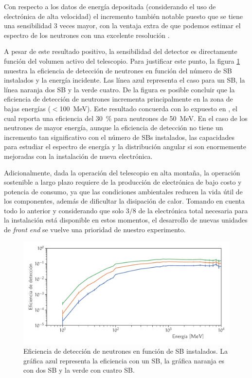 Con respecto a los datos de energía depositada (considerando el uso de electrónica de alta velocidad) el incremento también notable puesto que se tiene una sensibilidad \num{3} veces mayor, con la ventaja extra de que podemos estimar el espectro de los neutrones con una excelente resolución \cite{ysasai17}.

A pesar de este resultado positivo, la sensibilidad del detector es directamente función del volumen activo del telescopio. Para justificar este punto, la figura \ref{fig:eficiencia-electronica} muestra la eficiencia de detección de neutrones en función del número de SB instalados y la energía incidente. Las línea azul representa el caso para un SB, la línea naranja dos SB y la verde cuatro. De la figura es posible concluir que la eficiencia de detección de neutrones incrementa principalmente en la zona de bajas energías ($<$\SI{100}{\mega\electronvolt}). Este resultado concuerda con lo expuesto en \cite{nagaiphd}, el cual reporta una eficiencia del \SI{30}{\percent} para neutrones de \SI{50}{\mega\electronvolt}. En el caso de los neutrones de mayor energía, aunque la eficiencia de detección no tiene un incremento tan significativo con el número de SBs instalados, las capacidades para estudiar el espectro de energía y la distribución angular si son enormemente mejoradas con la instalación de nueva electrónica.

Adicionalmente, dada la operación del telescopio en alta montaña, la operación sostenible a largo plazo requiere de la producción de electrónica de bajo costo y potencia de consumo, ya que las condiciones ambientales reducen la vida útil de los componentes, además de dificultar la disipación de calor. Tomando en cuenta todo lo anterior y considerando que solo $3/8$ de la electrónica total necesaria para la instalación está disponible en estos momentos, el desarrollo de nuevas unidades de \emph{front end} se vuelve una prioridad de nuestro experimento.

\begin{figure}
        \centering
        \includegraphics[width=\textwidth]{electronics-deff.pdf}
        \caption{Eficiencia de detección de neutrones en función de SB instalados. La gráfica azul representa la eficiencia con un SB, la gráfica naranja es con dos SB y la verde con cuatro SB.}
        \label{fig:eficiencia-electronica}
\end{figure}

